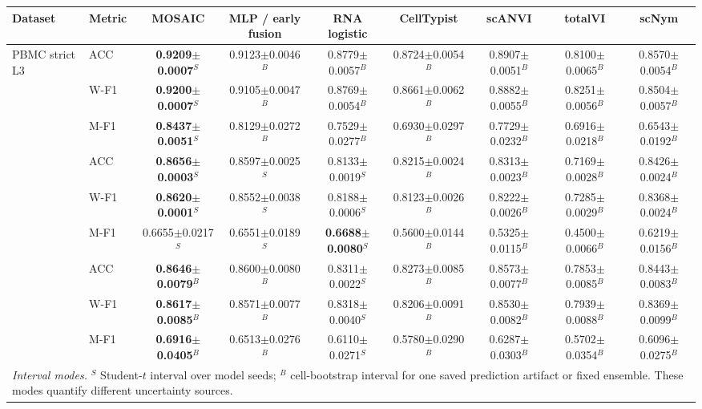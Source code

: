 \begin{tabular}{llccccccc}
\toprule
Dataset & Metric & MOSAIC & MLP / early fusion & RNA logistic & CellTypist & scANVI & totalVI & scNym \\
\midrule
\multirow{3}{*}{PBMC strict L3} & ACC & \textbf{0.9209$\pm$0.0007}$^{S}$ & 0.9123$\pm$0.0046$^{B}$ & 0.8779$\pm$0.0057$^{B}$ & 0.8724$\pm$0.0054$^{B}$ & 0.8907$\pm$0.0051$^{B}$ & 0.8100$\pm$0.0065$^{B}$ & 0.8570$\pm$0.0054$^{B}$ \\
 & W-F1 & \textbf{0.9200$\pm$0.0007}$^{S}$ & 0.9105$\pm$0.0047$^{B}$ & 0.8769$\pm$0.0054$^{B}$ & 0.8661$\pm$0.0062$^{B}$ & 0.8882$\pm$0.0055$^{B}$ & 0.8251$\pm$0.0056$^{B}$ & 0.8504$\pm$0.0057$^{B}$ \\
 & M-F1 & \textbf{0.8437$\pm$0.0051}$^{S}$ & 0.8129$\pm$0.0272$^{B}$ & 0.7529$\pm$0.0277$^{B}$ & 0.6930$\pm$0.0297$^{B}$ & 0.7729$\pm$0.0232$^{B}$ & 0.6916$\pm$0.0218$^{B}$ & 0.6543$\pm$0.0192$^{B}$ \\
\addlinespace[2pt]
\multirow{3}{*}{COVID-19 full} & ACC & \textbf{0.8656$\pm$0.0003}$^{S}$ & 0.8597$\pm$0.0025$^{S}$ & 0.8133$\pm$0.0019$^{S}$ & 0.8215$\pm$0.0024$^{B}$ & 0.8313$\pm$0.0023$^{B}$ & 0.7169$\pm$0.0028$^{B}$ & 0.8426$\pm$0.0024$^{B}$ \\
 & W-F1 & \textbf{0.8620$\pm$0.0001}$^{S}$ & 0.8552$\pm$0.0038$^{S}$ & 0.8188$\pm$0.0006$^{S}$ & 0.8123$\pm$0.0026$^{B}$ & 0.8222$\pm$0.0026$^{B}$ & 0.7285$\pm$0.0029$^{B}$ & 0.8368$\pm$0.0024$^{B}$ \\
 & M-F1 & 0.6655$\pm$0.0217$^{S}$ & 0.6551$\pm$0.0189$^{S}$ & \textbf{0.6688$\pm$0.0080}$^{S}$ & 0.5600$\pm$0.0144$^{B}$ & 0.5325$\pm$0.0115$^{B}$ & 0.4500$\pm$0.0066$^{B}$ & 0.6219$\pm$0.0156$^{B}$ \\
\addlinespace[2pt]
\multirow{3}{*}{GSE164378 exact-L3} & ACC & \textbf{0.8646$\pm$0.0079}$^{B}$ & 0.8600$\pm$0.0080$^{B}$ & 0.8311$\pm$0.0022$^{S}$ & 0.8273$\pm$0.0085$^{B}$ & 0.8573$\pm$0.0077$^{B}$ & 0.7853$\pm$0.0085$^{B}$ & 0.8443$\pm$0.0083$^{B}$ \\
 & W-F1 & \textbf{0.8617$\pm$0.0085}$^{B}$ & 0.8571$\pm$0.0077$^{B}$ & 0.8318$\pm$0.0040$^{S}$ & 0.8206$\pm$0.0091$^{B}$ & 0.8530$\pm$0.0082$^{B}$ & 0.7939$\pm$0.0088$^{B}$ & 0.8369$\pm$0.0099$^{B}$ \\
 & M-F1 & \textbf{0.6916$\pm$0.0405}$^{B}$ & 0.6513$\pm$0.0276$^{B}$ & 0.6110$\pm$0.0271$^{S}$ & 0.5780$\pm$0.0290$^{B}$ & 0.6287$\pm$0.0303$^{B}$ & 0.5702$\pm$0.0354$^{B}$ & 0.6096$\pm$0.0275$^{B}$ \\
\midrule
\multicolumn{9}{p{20.8cm}}{\textit{Interval modes.} $^{S}$ Student-$t$ interval over model seeds; $^{B}$ cell-bootstrap interval for one saved prediction artifact or fixed ensemble. These modes quantify different uncertainty sources.} \\
\bottomrule
\end{tabular}

